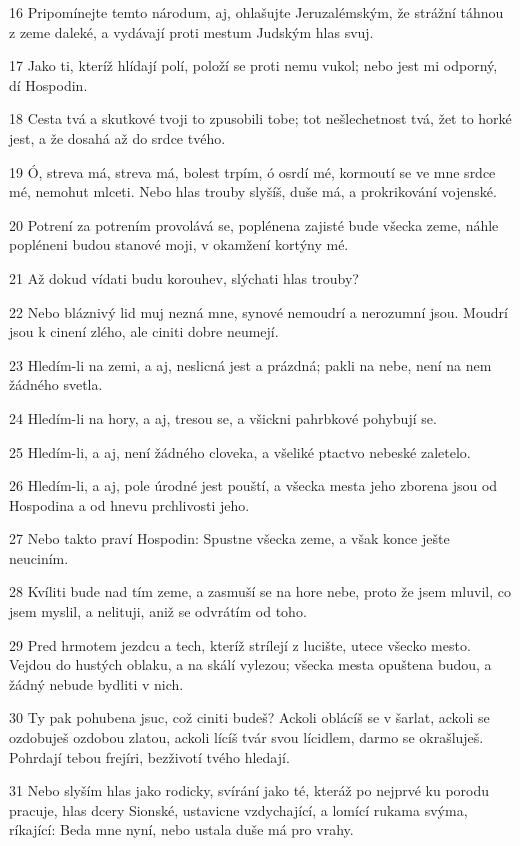 \par 16 Pripomínejte temto národum, aj, ohlašujte Jeruzalémským, že strážní táhnou z zeme daleké, a vydávají proti mestum Judským hlas svuj.
\par 17 Jako ti, kteríž hlídají polí, položí se proti nemu vukol; nebo jest mi odporný, dí Hospodin.
\par 18 Cesta tvá a skutkové tvoji to zpusobili tobe; tot nešlechetnost tvá, žet to horké jest, a že dosahá až do srdce tvého.
\par 19 Ó, streva má, streva má, bolest trpím, ó osrdí mé, kormoutí se ve mne srdce mé, nemohut mlceti. Nebo hlas trouby slyšíš, duše má, a prokrikování vojenské.
\par 20 Potrení za potrením provolává se, poplénena zajisté bude všecka zeme, náhle popléneni budou stanové moji, v okamžení kortýny mé.
\par 21 Až dokud vídati budu korouhev, slýchati hlas trouby?
\par 22 Nebo bláznivý lid muj nezná mne, synové nemoudrí a nerozumní jsou. Moudrí jsou k cinení zlého, ale ciniti dobre neumejí.
\par 23 Hledím-li na zemi, a aj, neslicná jest a prázdná; pakli na nebe, není na nem žádného svetla.
\par 24 Hledím-li na hory, a aj, tresou se, a všickni pahrbkové pohybují se.
\par 25 Hledím-li, a aj, není žádného cloveka, a všeliké ptactvo nebeské zaletelo.
\par 26 Hledím-li, a aj, pole úrodné jest pouští, a všecka mesta jeho zborena jsou od Hospodina a od hnevu prchlivosti jeho.
\par 27 Nebo takto praví Hospodin: Spustne všecka zeme, a však konce ješte neuciním.
\par 28 Kvíliti bude nad tím zeme, a zasmuší se na hore nebe, proto že jsem mluvil, co jsem myslil, a nelituji, aniž se odvrátím od toho.
\par 29 Pred hrmotem jezdcu a tech, kteríž strílejí z lucište, utece všecko mesto. Vejdou do hustých oblaku, a na skálí vylezou; všecka mesta opuštena budou, a žádný nebude bydliti v nich.
\par 30 Ty pak pohubena jsuc, což ciniti budeš? Ackoli oblácíš se v šarlat, ackoli se ozdobuješ ozdobou zlatou, ackoli lícíš tvár svou lícidlem, darmo se okrašluješ. Pohrdají tebou frejíri, bezživotí tvého hledají.
\par 31 Nebo slyším hlas jako rodicky, svírání jako té, kteráž po nejprvé ku porodu pracuje, hlas dcery Sionské, ustavicne vzdychající, a lomící rukama svýma, ríkající: Beda mne nyní, nebo ustala duše má pro vrahy.

